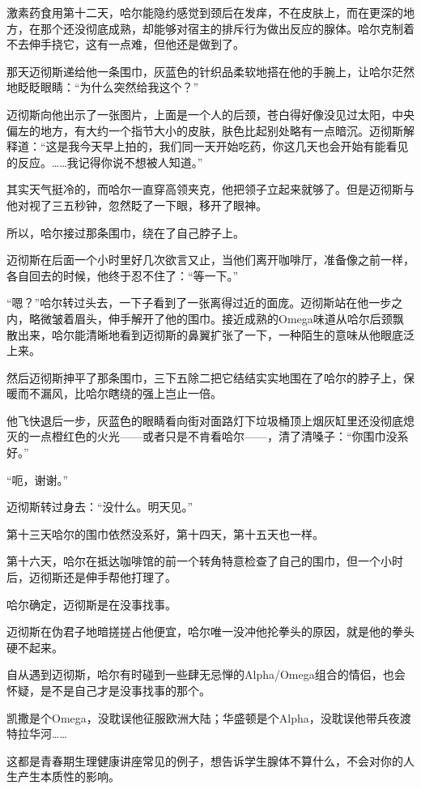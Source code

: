 \documentclass[../main]{subfiles}
\begin{document}
激素药食用第十二天，哈尔能隐约感觉到颈后在发痒，不在皮肤上，而在更深的地方，在那个还没彻底成熟，却能够对宿主的排斥行为做出反应的腺体。哈尔克制着不去伸手挠它，这有一点难，但他还是做到了。

那天迈彻斯递给他一条围巾，灰蓝色的针织品柔软地搭在他的手腕上，让哈尔茫然地眨眨眼睛：“为什么突然给我这个？”

迈彻斯向他出示了一张图片，上面是一个人的后颈，苍白得好像没见过太阳，中央偏左的地方，有大约一个指节大小的皮肤，肤色比起别处略有一点暗沉。迈彻斯解释道：“这是我今天早上拍的，我们同一天开始吃药，你这几天也会开始有能看见的反应。……我记得你说不想被人知道。”

其实天气挺冷的，而哈尔一直穿高领夹克，他把领子立起来就够了。但是迈彻斯与他对视了三五秒钟，忽然眨了一下眼，移开了眼神。

所以，哈尔接过那条围巾，绕在了自己脖子上。

迈彻斯在后面一个小时里好几次欲言又止，当他们离开咖啡厅，准备像之前一样，各自回去的时候，他终于忍不住了：“等一下。”

“嗯？”哈尔转过头去，一下子看到了一张离得过近的面庞。迈彻斯站在他一步之内，略微皱着眉头，伸手解开了他的围巾。接近成熟的Omega味道从哈尔后颈飘散出来，哈尔能清晰地看到迈彻斯的鼻翼扩张了一下，一种陌生的意味从他眼底泛上来。

然后迈彻斯抻平了那条围巾，三下五除二把它结结实实地围在了哈尔的脖子上，保暖而不漏风，比哈尔瞎绕的强上岂止一倍。

他飞快退后一步，灰蓝色的眼睛看向街对面路灯下垃圾桶顶上烟灰缸里还没彻底熄灭的一点橙红色的火光——或者只是不肯看哈尔——，清了清嗓子：“你围巾没系好。”

“呃，谢谢。”

迈彻斯转过身去：“没什么。明天见。”

第十三天哈尔的围巾依然没系好，第十四天，第十五天也一样。

第十六天，哈尔在抵达咖啡馆的前一个转角特意检查了自己的围巾，但一个小时后，迈彻斯还是伸手帮他打理了。

哈尔确定，迈彻斯是在没事找事。

迈彻斯在伪君子地暗搓搓占他便宜，哈尔唯一没冲他抡拳头的原因，就是他的拳头硬不起来。

自从遇到迈彻斯，哈尔有时碰到一些肆无忌惮的Alpha/Omega组合的情侣，也会怀疑，是不是自己才是没事找事的那个。

凯撒是个Omega，没耽误他征服欧洲大陆；华盛顿是个Alpha，没耽误他带兵夜渡特拉华河……

这都是青春期生理健康讲座常见的例子，想告诉学生腺体不算什么，不会对你的人生产生本质性的影响。
\end{document}
